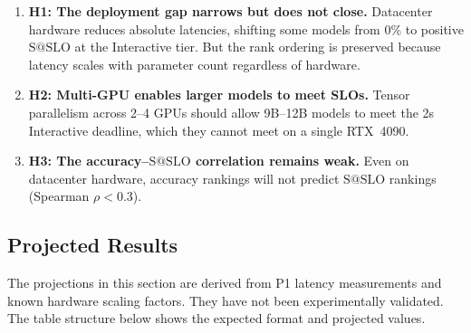 \documentclass[11pt]{article}
\makeatletter
\newcommand{\sslo}{\ensuremath{\mathrm{S@SLO}}}
\makeatother
\begin{document}
\begin{enumerate}[leftmargin=16pt]
    \item \textbf{H1: The deployment gap narrows but does not close.} Datacenter hardware reduces absolute latencies, shifting some models from 0\% to positive $\sslo{}$ at the Interactive tier. But the rank ordering is preserved because latency scales with parameter count regardless of hardware.

    \item \textbf{H2: Multi-GPU enables larger models to meet SLOs.} Tensor parallelism across 2--4 GPUs should allow 9B--12B models to meet the 2s Interactive deadline, which they cannot meet on a single RTX~4090.

    \item \textbf{H3: The accuracy--$\sslo{}$ correlation remains weak.} Even on datacenter hardware, accuracy rankings will not predict $\sslo{}$ rankings (Spearman $\rho < 0.3$).
\end{enumerate}

\subsection{Projected Results}

The projections in this section are derived from P1 latency measurements and known hardware scaling factors. They have not been experimentally validated. The table structure below shows the expected format and projected values.
\end{document}
